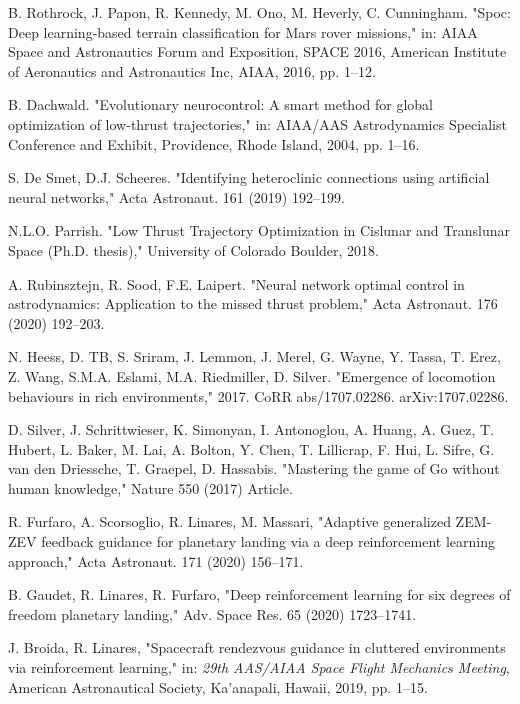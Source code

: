 \documentclass[a4paper]{article}
\begin{document}
\begin{thebibliography}{1}
		B. Rothrock, J. Papon, R. Kennedy, M. Ono, M. Heverly, C. Cunningham.
		"Spoc: Deep learning-based terrain classification for Mars rover missions,"
		in: AIAA Space and Astronautics Forum and Exposition, SPACE 2016,
		American Institute of Aeronautics and Astronautics Inc, AIAA, 2016, pp. 1–12.
		
		B. Dachwald.
		"Evolutionary neurocontrol: A smart method for global optimization of low-thrust trajectories,"
		in: AIAA/AAS Astrodynamics Specialist Conference and Exhibit,
		Providence, Rhode Island, 2004, pp. 1–16.
		
		S. De Smet, D.J. Scheeres.
		"Identifying heteroclinic connections using artificial neural networks,"
		Acta Astronaut. 161 (2019) 192–199.
		
		N.L.O. Parrish.
		"Low Thrust Trajectory Optimization in Cislunar and Translunar Space (Ph.D. thesis),"
		University of Colorado Boulder, 2018.
		
		A. Rubinsztejn, R. Sood, F.E. Laipert.
		"Neural network optimal control in astrodynamics: Application to the missed thrust problem,"
		Acta Astronaut. 176 (2020) 192–203.
		
		N. Heess, D. TB, S. Sriram, J. Lemmon, J. Merel, G. Wayne, Y. Tassa, T. Erez, Z. Wang, S.M.A. Eslami, M.A. Riedmiller, D. Silver.
		"Emergence of locomotion behaviours in rich environments," 2017.
		CoRR abs/1707.02286.
		arXiv:1707.02286.
		
		D. Silver, J. Schrittwieser, K. Simonyan, I. Antonoglou, A. Huang, A. Guez, T. Hubert, L. Baker, M. Lai, A. Bolton, Y. Chen, T. Lillicrap, F. Hui, L. Sifre, G. van den Driessche, T. Graepel, D. Hassabis.
		"Mastering the game of Go without human knowledge," Nature 550 (2017) Article.
		
		R. Furfaro, A. Scorsoglio, R. Linares, M. Massari,
		"Adaptive generalized ZEM-ZEV feedback guidance for planetary landing via a deep reinforcement learning approach,"
		Acta Astronaut. 171 (2020) 156–171.
		
		B. Gaudet, R. Linares, R. Furfaro,
		"Deep reinforcement learning for six degrees of freedom planetary landing,"
		Adv. Space Res. 65 (2020) 1723–1741.
		
		J. Broida, R. Linares,
		"Spacecraft rendezvous guidance in cluttered environments via reinforcement learning,"
		in: \textit{29th AAS/AIAA Space Flight Mechanics Meeting}, American Astronautical Society, Ka’anapali, Hawaii, 2019, pp. 1–15.
		

\end{thebibliography}
\end{document}
